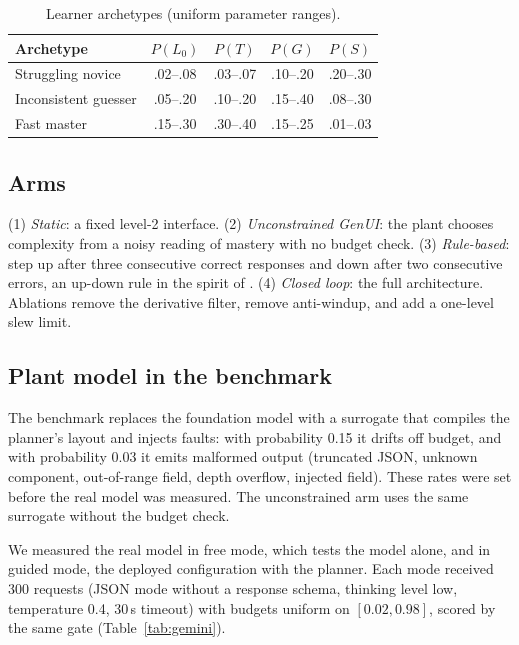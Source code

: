 \documentclass[conference]{IEEEtran}
\begin{document}
\begin{table}[t]
\centering
\caption{Learner archetypes (uniform parameter ranges).}
\label{tab:archetypes}
\begin{tabular}{lcccc}
\toprule
Archetype & $P(L_0)$ & $P(T)$ & $P(G)$ & $P(S)$\\
\midrule
Struggling novice & .02--.08 & .03--.07 & .10--.20 & .20--.30\\
Inconsistent guesser & .05--.20 & .10--.20 & .15--.40 & .08--.30\\
Fast master & .15--.30 & .30--.40 & .15--.25 & .01--.03\\
\bottomrule
\end{tabular}
\end{table}

\subsection{Arms}
(1) \emph{Static}: a fixed level-2 interface. (2) \emph{Unconstrained GenUI}:
the plant chooses complexity from a noisy reading of mastery with no budget
check. (3) \emph{Rule-based}: step up after three consecutive correct
responses and down after two consecutive errors, an up-down rule in the
spirit of \cite{levitt1971updown}. (4) \emph{Closed loop}:
the full architecture. Ablations remove the derivative filter, remove
anti-windup, and add a one-level slew limit.

\subsection{Plant model in the benchmark}
The benchmark replaces the foundation model with a surrogate that compiles
the planner's layout and injects faults: with probability 0.15 it
drifts off budget, and with probability 0.03 it emits malformed output
(truncated JSON, unknown component, out-of-range field, depth overflow,
injected field). These rates were set before the real model was measured.
The unconstrained arm uses the same surrogate without the budget check.

We measured the real model in free mode, which tests the model alone, and
in guided mode, the deployed configuration with the planner. Each mode received 300 requests (JSON mode without a response
schema, thinking level low, temperature 0.4, 30\,s timeout) with budgets
uniform on $[0.02,0.98]$, scored by the same gate (Table~\ref{tab:gemini}).
\end{document}
